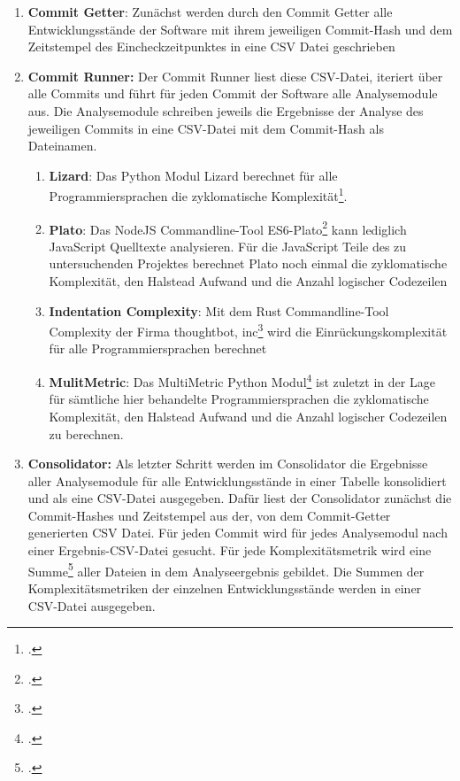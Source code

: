 \begin{enumerate}
\def\labelenumi{\arabic{enumi}.}
\item
    \textbf{Commit Getter}: Zunächst werden durch den Commit Getter alle
    Entwicklungsstände der Software mit ihrem jeweiligen Commit-Hash und
    dem Zeitstempel des Eincheckzeitpunktes in eine \ac{CSV} Datei geschrieben
\item
    \textbf{Commit Runner:} Der Commit Runner liest diese \ac{CSV}-Datei,
    iteriert über alle Commits und führt für jeden Commit der Software
    alle Analysemodule aus. Die Analysemodule schreiben jeweils die
    Ergebnisse der Analyse des jeweiligen Commits in eine \ac{CSV}-Datei mit
    dem Commit-Hash als Dateinamen.

    \begin{enumerate}
    \def\labelenumii{\alph{enumii}.}
    \item
    \textbf{Lizard}: Das Python Modul Lizard berechnet für alle
    Programmiersprachen die zyklomatische Komplexität\footcite[Vgl. ][]{LizardPythonModule}.
    \item
    \textbf{Plato}: Das NodeJS Commandline-Tool ES6-Plato\footcite[Vgl. ][]{Es6platoLibMaster}
    kann lediglich JavaScript Quelltexte analysieren. Für die JavaScript
    Teile des zu untersuchenden Projektes berechnet Plato noch einmal
    die zyklomatische Komplexität, den Halstead Aufwand und die Anzahl
    logischer Codezeilen
    \item
    \textbf{Indentation Complexity}: Mit dem Rust Commandline-Tool
    Complexity der Firma thoughtbot, inc\footcite[Vgl. ][]{Complexity2022} wird
    die Einrückungskomplexität für alle Programmiersprachen berechnet
    \item
    \textbf{MulitMetric}: Das MultiMetric Python Modul\footcite[Vgl. ][]{weihmanMultimetric2021}
    ist zuletzt in der Lage für sämtliche hier behandelte
    Programmiersprachen die zyklomatische Komplexität, den Halstead
    Aufwand und die Anzahl logischer Codezeilen zu berechnen.
    \end{enumerate}
\item
    \textbf{Consolidator:} Als letzter Schritt werden im Consolidator die
    Ergebnisse aller Analysemodule für alle Entwicklungsstände in einer
    Tabelle konsolidiert und als eine \ac{CSV}-Datei ausgegeben. Dafür liest
    der Consolidator zunächst die Commit-Hashes und Zeitstempel aus der,
    von dem Commit-Getter generierten \ac{CSV} Datei. Für jeden Commit wird für
    jedes Analysemodul nach einer Ergebnis-\ac{CSV}-Datei gesucht. Für jede
    Komplexitätsmetrik wird eine Summe\footcite[Vgl. ][S. 276]{hoffmannSoftwareQualitat2013} aller
    Dateien in dem Analyseergebnis gebildet. Die Summen der
    Komplexitätsmetriken der einzelnen Entwicklungsstände werden in einer
    CSV-Datei ausgegeben.
\end{enumerate}

